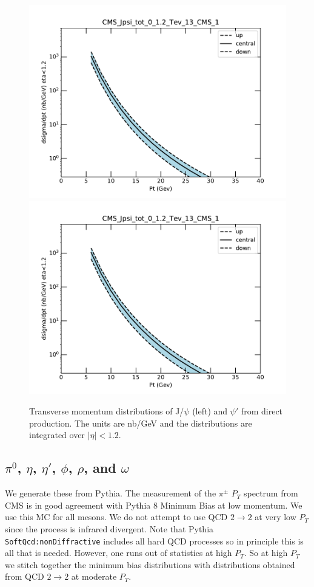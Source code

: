 \documentclass[12pt]{article}
\begin{document}
\begin{figure}
  \includegraphics[width=0.48\linewidth]{../oniaDirect/CMS-13-TeV/theory/CMS-Jpsi-tot-0-12-Tev-13-CMS-1.pdf}  
\includegraphics[width=0.48\linewidth]{../oniaDirect/CMS-13-TeV/theory/CMS-Jpsi-tot-0-12-Tev-13-CMS-1.pdf}  
  \caption{Transverse momentum distributions of J/$\psi$ (left) 
and $\psi'$ from direct production. The units are nb/GeV and the 
distributions 
are integrated over $|\eta|<1.2$.}
  \label{fig:ma}
\end{figure}



\subsection{$\pi^0$, $\eta$, $\eta'$, $\phi$, $\rho$, and $\omega$}
\label{sec:mesons}

We generate these from Pythia.  The measurement of the 
$\pi^{\pm}$
$P_T$ spectrum from CMS\cite{Sirunyan:2017zmn} is in good agreement
with Pythia 8 Minimum Bias at low momentum.  We use this MC for all
mesons.  We do not attempt to use QCD $2 \to 2$ at very low $P_T$ since the 
process is infrared divergent.
Note that Pythia {\tt SoftQcd:nonDiffractive} includes all
hard QCD processes\cite{wwwPythia} so in principle this is all that is
needed.    However, one runs out of statistics at high $P_T$.  So 
at high $P_T$ we stitch together the minimum bias distributions with 
distributions obtained from QCD $2 \to 2$ at moderate $P_T$.
\end{document}
